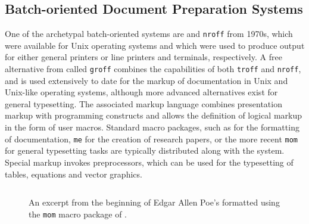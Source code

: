 \documentclass{book}
\begin{document}
\subsection{Batch-oriented Document Preparation Systems}
One of the archetypal batch-oriented systems are  and
 \texttt{nroff} from 1970s, which
were available for Unix operating systems and which were used to produce output
for either general printers or line printers and terminals, respectively. A free
alternative from  called \texttt{groff}
 combines the capabilities of both
\texttt{troff} and \texttt{nroff}, and is used extensively to date for the
markup of documentation in Unix and Unix-like operating systems, although more
advanced alternatives exist for general typesetting. The associated markup
language combines presentation markup with programming constructs and allows the
definition of logical markup in the form of user macros.  Standard macro
packages, such as  for the formatting of documentation,
\texttt{me}  for the creation of research
papers, or the more recent \texttt{mom}  for
general typesetting tasks are typically distributed along with the system.
Special markup invokes preprocessors, which can be used for the typesetting of
tables, equations and vector graphics.

\begin{figure}
  \inputminted{groff}{examples/02/poe.groff}
  \caption{An excerpt from the beginning of Edgar Allen Poe's  formatted using the \texttt{mom}
     macro package of .}
  \label{fig:poe}
\end{figure}

\end{document}
